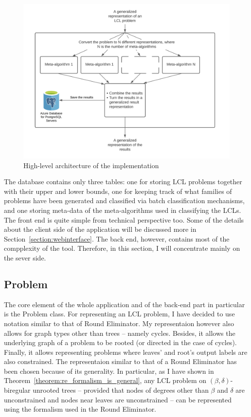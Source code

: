 \begin{figure}[ht]
  \begin{center}
    \includegraphics[width=\textwidth]{images/tool-architecture.png}
    \caption{High-level architecture of the implementation}
    \label{fig:implementation-architecture}
  \end{center}
\end{figure}

The database contains only three tables: one for
storing LCL problems together with their upper and
lower bounds, one for keeping track of what families of
problems have been generated and classified via batch
classification mechanisms, and one storing meta-data
of the meta-algorithms used in classifying the LCLs.
The front end is quite simple from technical perspective
too. Some of the details about the client side of the
application will be discussed more in Section~\ref{section:webinterface}.
The back end, however, contains most of the compplexity of
the tool. Therefore, in this section, I will concentrate
mainly on the sever side.

\subsection{Problem}

The core element of the whole application and of the
back-end part in particular is the Problem class.
For representing an LCL problem, I have decided
to use notation similar to that of Round
Eliminator. My representaion however also
allows for graph types other than trees -- namely cycles.
Besides, it allows the underlying graph of a problem
to be rooted (or directed in the case of cycles).
Finally, it allows representing problems where
leaves' and root's output labels are also constrained.
The representaion similar to that of a Round
Eliminator has been chosen because of its generality.
In particular, as I have shown in Theorem~\ref{theorem:re_formalism_is_general},
any LCL problem
on $(\beta, \delta)$-biregular unrooted trees -- provided
that nodes of degrees other than $\beta$ and $\delta$ are unconstrained
and nodes near leaves are unconstrained -- can be represented
using the formalism used in the Round Eliminator.

